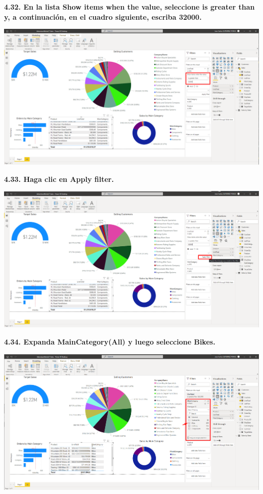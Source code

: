 \documentclass{article}
\begin{document}
\textbf{4.32. En la lista \textbf{Show items when the value}, seleccione \textbf{is greater than} y, a continuación, en el cuadro siguiente, escriba \textbf{32000}.}

    \begin{center}
		\includegraphics[width=14cm]{./images/108} 
	\end{center}

\newpage
\textbf{4.33. Haga clic en \textbf{Apply filter}.}

    \begin{center}
		\includegraphics[width=14cm]{./images/109} 
	\end{center}


\textbf{4.34. Expanda \textbf{MainCategory(All)} y luego seleccione \textbf{Bikes}.}

    \begin{center}
		\includegraphics[width=14cm]{./images/110} 
	\end{center}
\end{document}
